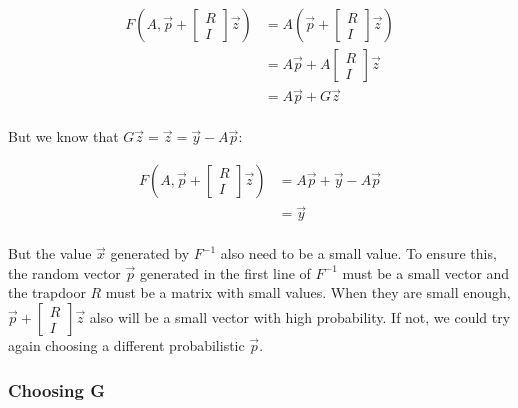 \documentclass[a4paper]{article}
\begin{document}
 \begin{equation*}
 \begin{split}
 F(A, \overrightarrow{p}
 + \begin{bmatrix}R\\I\end{bmatrix}\overrightarrow{z}) &=
   A(\overrightarrow{p}
   + \begin{bmatrix}R\\I\end{bmatrix}\overrightarrow{z})\\ &=
     A\overrightarrow{p} +
     A\begin{bmatrix}R\\I\end{bmatrix}\overrightarrow{z}\\ &=
     A\overrightarrow{p} + G\overrightarrow{z}\\
 \end{split}
 \end{equation*}
 
 But we know that
 $G\overrightarrow{z}=\overrightarrow{z}=\overrightarrow{y} -
 A\overrightarrow{p}$:
 
  \begin{equation*}
 \begin{split}
 F(A, \overrightarrow{p}
 + \begin{bmatrix}R\\I\end{bmatrix}\overrightarrow{z}) &=
   A\overrightarrow{p} + \overrightarrow{y} - A\overrightarrow{p}\\ &=
   \overrightarrow{y}\\
  \end{split}
 \end{equation*}
 
 But the value $\overrightarrow{x}$ generated by $F^{-1}$ also need to
 be a small value. To ensure this, the random vector
 $\overrightarrow{p}$ generated in the first line of $F^{-1}$ must be
 a small vector and the trapdoor $R$ must be a matrix with small
 values. When they are small enough, $\overrightarrow{p}
 + \begin{bmatrix}R\\I\end{bmatrix}\overrightarrow{z}$ also will be a
   small vector with high probability. If not, we could try again
   choosing a different probabilistic $\overrightarrow{p}$.
 
 \subsubsection{Choosing G}
 
\end{document}
